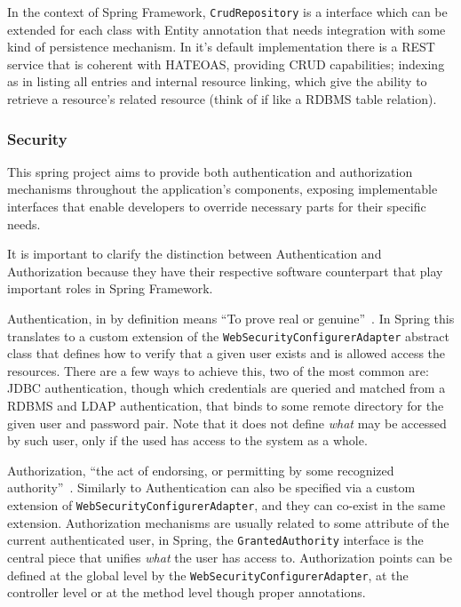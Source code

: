 In the context of Spring Framework, \texttt{CrudRepository} is a interface which can be extended for each class with Entity annotation that needs integration with some kind of persistence mechanism. In it's default implementation there is a \gls{REST} service that is coherent with \gls{HATEOAS}, providing \gls{CRUD} capabilities; indexing as in listing all entries and internal resource linking, which give the ability to retrieve a resource's related resource (think of if like a \gls{RDBMS} table relation).

\subsubsection{Security}
This spring project aims to provide both authentication and authorization mechanisms throughout the application's components, exposing implementable interfaces that enable developers to override necessary parts for their specific needs.

It is important to clarify the distinction between Authentication and Authorization because they have their respective software counterpart that play important roles in Spring Framework.

Authentication, in by definition means ``To prove real or genuine''~\cite{merriamwebster}. In Spring this translates to a custom extension of the \texttt{WebSecurityConfigurerAdapter} abstract class that defines how to verify that a given user exists and is allowed access the resources. There are a few ways to achieve this, two of the most common are: \gls{JDBC} authentication, though which credentials are queried and matched from a \gls{RDBMS} and \gls{LDAP} authentication, that binds to some remote directory for the given user and password pair. Note that it does not define \textit{what} may be accessed by such user, only if the used has access to the system as a whole.

Authorization, ``the act of endorsing, or permitting by some recognized authority''~\cite{merriamwebster}. Similarly to Authentication can also be specified via a custom extension of \texttt{WebSecurityConfigurerAdapter}, and they can co-exist in the same extension. Authorization mechanisms are usually related to some attribute of the current authenticated user, in Spring, the \texttt{GrantedAuthority} interface is the central piece that unifies \textit{what} the user has access to. Authorization points can be defined at the global level by the \texttt{WebSecurityConfigurerAdapter}, at the controller level or at the method level though proper annotations.

